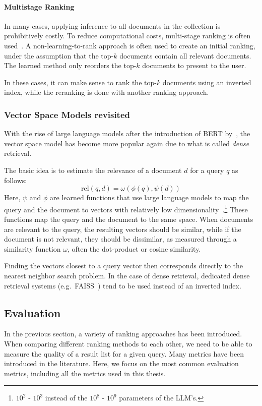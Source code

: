 \paragraph{Multistage Ranking}
\label{sec:multistage}
In many cases, applying inference to all documents in the collection is prohibitively costly. To reduce computational costs, multi-stage ranking is often used~\citep{multi-stage}.
A non-learning-to-rank approach is often used to create an initial ranking, under the assumption that the top-$k$ documents contain all relevant documents. The learned method only reorders the top-$k$ documents to present to the user. 

In these cases, it can make sense to rank the top-$k$ documents using an inverted index, while the reranking is done with another ranking approach.

\subsubsection{Vector Space Models revisited}
With the rise of large language models after the introduction of BERT by~\cite{BERT}, the vector space model has become more popular again due to what is called \emph{dense} retrieval.  

The basic idea is to estimate the relevance of a document $d$ for a query $q$ as follows:
\begin{equation}
	\text{rel}(q, d) = \omega\left(\phi\left(q\right),
	\psi\left(d\right)\right)
\end{equation}
Here, $\psi$ and $\phi$ are learned functions that use large language models to map the query and the document to vectors with relatively low dimensionality~\citep{seperation-logical-physical}.\footnote{$10^2$ - $10^3$ instead of the $10^8$ - $10^9$ parameters of the LLM's.} These functions map the query and the document to the same space. When documents are relevant to the query, the resulting vectors should be similar, while if the document is not relevant, they should be dissimilar, as measured through a similarity function $\omega$, often the dot-product or cosine similarity.

Finding the vectors closest to a query vector then corresponds directly to the nearest neighbor search problem. In the case of dense retrieval, dedicated dense retrieval systems (e.g.\ FAISS~\citep{faiss}) tend to be used instead of an inverted index. 

\subsection{Evaluation}
\label{sec:evaluation}
In the previous section, a variety of ranking approaches has been introduced. When comparing different ranking methods to each other, we need to be able to measure the quality of a result list for a given query. Many metrics have been introduced in the literature. Here, we focus on the most common evaluation metrics, including all the metrics used in this thesis.  

